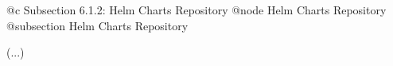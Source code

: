 @c Subsection 6.1.2: Helm Charts Repository
@node Helm Charts Repository
@subsection Helm Charts Repository

(...)

